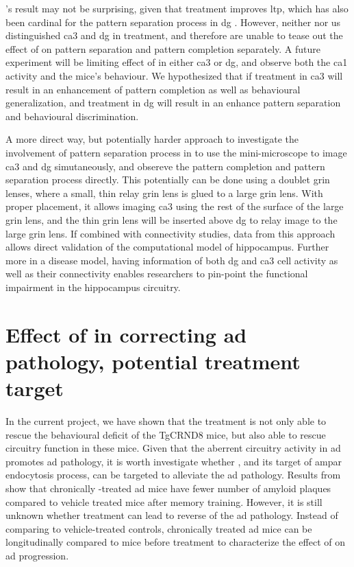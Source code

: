 \citet{migues16}'s result may not be surprising, given that \tglu treatment improves \gls{ltp}, which has also been cardinal for the pattern separation process in \gls{dg} \citep{rolls13}. However, neither \citet{migues16} nor us distinguished \gls{ca3} and \gls{dg} in \tglu treatment, and therefore are unable to tease out the effect of \tglu on pattern separation and pattern completion separately. A future experiment will be limiting effect of \tglu in either \gls{ca3} or \gls{dg}, and observe both the \gls{ca1} activity and the mice's behaviour. We hypothesized that if \tglu treatment in \gls{ca3} will result in an enhancement of pattern completion as well as behavioural generalization, and treatment in \gls{dg} will result in an enhance pattern separation and behavioural discrimination. 

A more direct way, but potentially harder approach to investigate the involvement of pattern separation process in to use the mini-microscope to image \gls{ca3} and \gls{dg} simutaneously, and obsereve the pattern completion and pattern separation process directly. This potentially can be done using a doublet \gls{grin} lenses, where a small, thin relay \gls{grin} lens is glued to a large \gls{grin} lens. With proper placement, it allows imaging \gls{ca3} using the rest of the surface of the large \gls{grin} lens, and the thin \gls{grin} lens will be inserted above \gls{dg} to relay image to the large \gls{grin} lens. If combined with connectivity studies, data from this approach allows direct validation of the computational model of hippocampus. Further more in a disease model, having information of both \gls{dg} and \gls{ca3} cell activity as well as their connectivity enables researchers to pin-point the functional impairment in the hippocampus circuitry.


\section{Effect of \tglu in correcting \gls{ad} pathology, potential treatment target}

In the current project, we have shown that the \tglu treatment is not only able to rescue the behavioural deficit of the TgCRND8 mice, but also able to rescue circuitry function in these mice. Given that the aberrent circuitry activity in \gls{ad} promotes \gls{ad} pathology, it is worth investigate whether \tglu, and its target of \gls{ampar} endocytosis process, can be targeted to alleviate the \gls{ad} pathology. Results from \citet{dong15} show that chronically \tglu-treated \gls{ad} mice have fewer number of amyloid plaques compared to vehicle treated mice after memory training. However, it is still unknown whether \tglu treatment can lead to reverse of the \gls{ad} pathology. Instead of comparing to vehicle-treated controls, chronically treated \gls{ad} mice can be longitudinally compared to mice before treatment to characterize the effect of \tglu on \gls{ad} progression.

